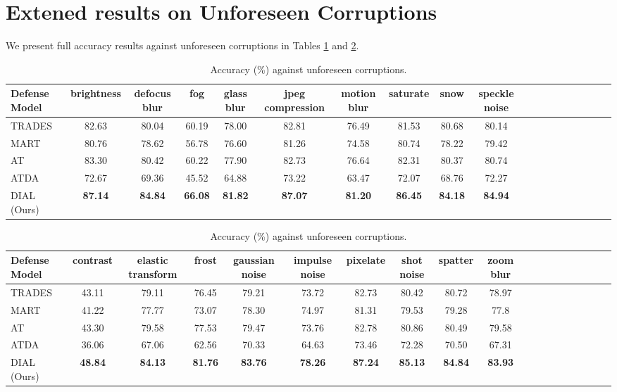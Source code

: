 \newpage
\section{Extened results on Unforeseen Corruptions}
\label{corruptions-apendix}
We present full accuracy results against unforeseen corruptions in Tables \ref{corruption-table1} and \ref{corruption-table2}. 

\begin{table}[!ht]
  \caption{Accuracy (\%) against unforeseen corruptions.}
  \label{corruption-table1}
  \vskip 0.15in
  \centering
  \tiny
  \begin{tabular}{lcccccccccccccccccc}
    \toprule
    Defense Model & brightness & defocus blur & fog & glass blur & jpeg compression & motion blur & saturate & snow & speckle noise  \\
    \midrule
    TRADES & 82.63 & 80.04 & 60.19 & 78.00 & 82.81 & 76.49 & 81.53 & 80.68 & 80.14 \\
    MART & 80.76 & 78.62 & 56.78 & 76.60 & 81.26 & 74.58 & 80.74 & 78.22 & 79.42 \\
    AT &  83.30 & 80.42 & 60.22 & 77.90 & 82.73 & 76.64 & 82.31 & 80.37 & 80.74 \\
    ATDA & 72.67 & 69.36 & 45.52 & 64.88 & 73.22 & 63.47 & 72.07 & 68.76 & 72.27 \\
    DIAL (Ours)  & \textbf{87.14} & \textbf{84.84} & \textbf{66.08} & \textbf{81.82} & \textbf{87.07} & \textbf{81.20} & \textbf{86.45} & \textbf{84.18} & \textbf{84.94} \\
    \bottomrule
  \end{tabular}
\end{table}


\begin{table}[!ht]
  \caption{Accuracy (\%) against unforeseen corruptions.}
  \label{corruption-table2}
  \vskip 0.15in
  \centering
  \tiny
  \begin{tabular}{lcccccccccccccccccc}
    \toprule
    Defense Model & contrast & elastic transform & frost & gaussian noise & impulse noise & pixelate & shot noise & spatter & zoom blur \\
    \midrule
    TRADES & 43.11 & 79.11 & 76.45 & 79.21 & 73.72 & 82.73 & 80.42 & 80.72 & 78.97 \\
    MART & 41.22 & 77.77 & 73.07 & 78.30 & 74.97 & 81.31 & 79.53 & 79.28 & 77.8 \\
    AT & 43.30 & 79.58 & 77.53 & 79.47 & 73.76 & 82.78 & 80.86 & 80.49 & 79.58 \\
    ATDA & 36.06 & 67.06 & 62.56 & 70.33 & 64.63 & 73.46 & 72.28 & 70.50 & 67.31 \\
    DIAL (Ours) & \textbf{48.84} & \textbf{84.13} & \textbf{81.76} & \textbf{83.76} & \textbf{78.26} & \textbf{87.24} & \textbf{85.13} & \textbf{84.84} & \textbf{83.93}  \\
    \bottomrule
  \end{tabular}
\end{table}


